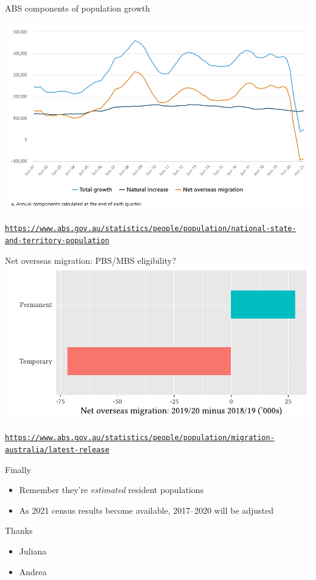 \documentclass[aspectratio=169,12pt]{beamer} %
\begin{document}
\begin{frame}{ABS components of population growth}

	\center\includegraphics[height=0.75\textheight]{ref/pop-components.PNG}
	\begin{flushright}\tiny\texttt{\url{https://www.abs.gov.au/statistics/people/population/national-state-and-territory-population}}\end{flushright}
\end{frame}

\begin{frame}{Net overseas migration: PBS/MBS eligibility?}
	\center\includegraphics[height=0.75\textheight]{ref/pops-nom.pdf}
	\begin{flushright}\tiny\texttt{\url{https://www.abs.gov.au/statistics/people/population/migration-australia/latest-release}}\end{flushright}
\end{frame}


\begin{frame}{Finally}
	\begin{itemize}
		\item Remember they're \emph{estimated} resident populations
		\item As 2021 census results become available, 2017--2020 will be adjusted
	\end{itemize}
\end{frame}

\begin{frame}{Thanks}
    \begin{itemize}
        \item Juliana
        \item Andrea
    \end{itemize}
\end{frame}
\end{document}
